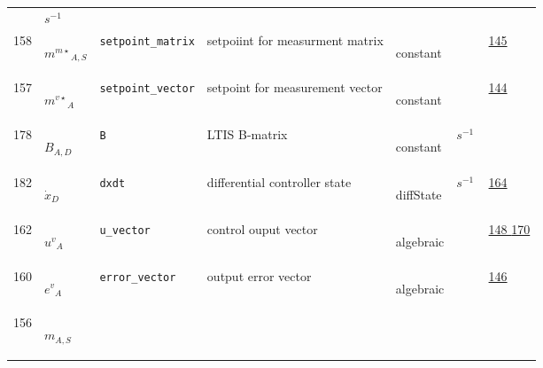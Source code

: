 \begin{longtable}{|p{1cm}|p{2.5cm}|p{4.5cm}|p{8cm}|p{3.0cm}|p{3cm}|p{1cm}|}
             & $ s^{-1} \, $
             & \\
            158
             & \hypertarget{"v:158"}{ $ {{m^{m\star}}}{_{A, S}} $}
             & \verb|setpoint_matrix|
             & setpoiint for measurment matrix
             & \begin{lay}constant \end{lay}
             & $  $
             &                 \hyperlink{"e:145"}{ 145 }
                 \\
            157
             & \hypertarget{"v:157"}{ $ {{m^{v\star}}}{_{A}} $}
             & \verb|setpoint_vector|
             & setpoint for measurement vector
             & \begin{lay}constant \end{lay}
             & $  $
             &                 \hyperlink{"e:144"}{ 144 }
                 \\
            178
             & \hypertarget{"v:178"}{ $ {B}{_{A, D}} $}
             & \verb|B|
             & LTIS B-matrix
             & \begin{lay}constant \end{lay}
             & $ s^{-1} \, $
             & \\
            182
             & \hypertarget{"v:182"}{ $ {{\dot{x}}}{_{D}} $}
             & \verb|dxdt|
             & differential controller state
             & \begin{lay}diffState \end{lay}
             & $ s^{-1} \, $
             &                 \hyperlink{"e:164"}{ 164 }
                 \\
            162
             & \hypertarget{"v:162"}{ $ {{u^{v}}}{_{A}} $}
             & \verb|u_vector|
             & control ouput vector
             & \begin{lay}algebraic \end{lay}
             & $  $
             &                 \hyperlink{"e:148"}{ 148 }
                                 \hyperlink{"e:170"}{ 170 }
                 \\
            160
             & \hypertarget{"v:160"}{ $ {{e^{v}}}{_{A}} $}
             & \verb|error_vector|
             & output error vector
             & \begin{lay}algebraic \end{lay}
             & $  $
             &                 \hyperlink{"e:146"}{ 146 }
                 \\
            156
             & \hypertarget{"v:156"}{ $ {m}{_{A, S}} $}

\end{longtable}
